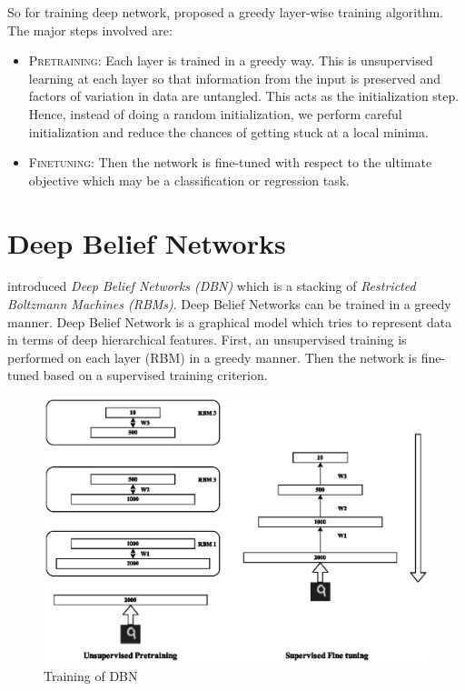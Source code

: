 So for training deep network, \citet{hinton2006reducing} proposed a greedy layer-wise training algorithm. The major steps involved are:
\begin{itemize}
\item \textsc{Pretraining}: Each layer is trained in a greedy way. This is unsupervised learning at each layer so that information from the input is preserved and factors of variation in data are untangled. This acts as the initialization step. Hence, instead of doing a random initialization, we perform careful initialization and reduce the chances of getting stuck at a local minima.
\item \textsc{Finetuning}: Then the network is fine-tuned with respect to the ultimate objective which may be a classification or regression task.
\end{itemize}

\section{Deep Belief Networks}
\citet{hinton2006reducing} introduced \emph{Deep Belief Networks (DBN)} which is a stacking of \emph{Restricted Boltzmann Machines (RBMs)}. Deep Belief Networks can be trained in a greedy manner\cite{hinton2006reducing}. Deep Belief Network is a graphical model which tries to represent data in terms of deep hierarchical features. First, an unsupervised training is performed on each layer (RBM) in a greedy manner. Then the network is fine-tuned based on a supervised training criterion.\\
\begin{figure}[!ht]
\centering
\includegraphics[width=1\textwidth]{./imgs/RBM_Train.eps} 
\caption{Training of DBN}
\end{figure}

